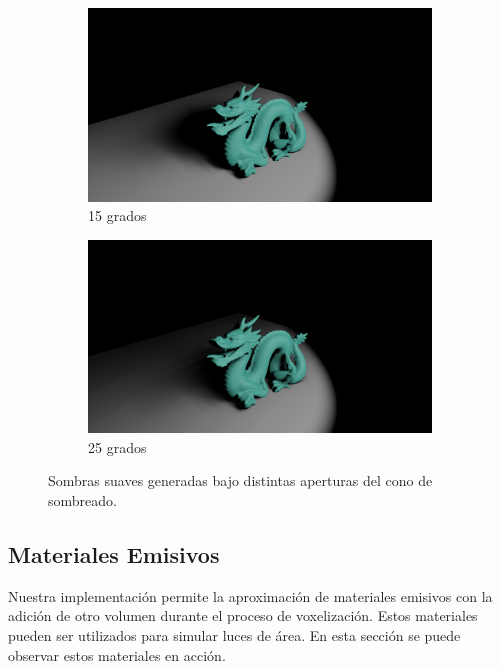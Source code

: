 \begin{figure}[H]
	\centering
	\begin{subfigure}[b]{.49\linewidth}
		\centering
		\captionsetup{justification=centering}
		\caption*{15 grados}
		\includegraphics[width=\linewidth]{media/finals/shadow_15.png}
	\end{subfigure}%
	\hspace{0.01\textwidth}
	\begin{subfigure}[b]{.49\linewidth}
		\centering
		\captionsetup{justification=centering}
		\caption*{25 grados}
		\includegraphics[width=\linewidth]{media/finals/shadow_25.png}
	\end{subfigure}%
	\caption{Sombras suaves generadas bajo distintas aperturas del cono de sombreado.}
	\label{fig:soft_aperture}
\end{figure}

\subsection{Materiales Emisivos}

Nuestra implementación permite la aproximación de materiales emisivos con la adición de otro volumen durante el proceso de voxelización. Estos materiales pueden ser utilizados para simular luces de área. En esta sección se puede observar estos materiales en acción.

